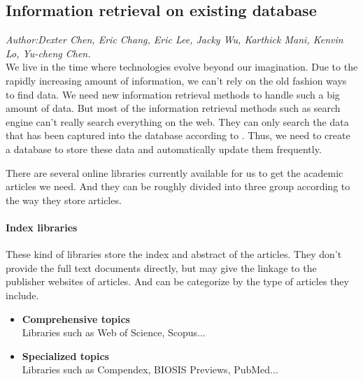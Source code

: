 	
\subsection{Information retrieval on existing database}
\textit{\footnotesize Author:Dexter Chen, Eric Chang, Eric Lee, Jacky Wu, Karthick Mani, Kenvin Lo, Yu-cheng Chen.}\\

We live in the time where technologies evolve beyond our imagination. Due to the rapidly increasing amount of information, we can't rely on the old fashion ways to find data. We need new information retrieval methods to handle such a big amount of data. But most of the information retrieval methods such as search engine can't really search everything on the web. They can only search the data that has been captured into the database according to \cite{Grehan2002}. Thus, we need to create a database to store these data and automatically update them frequently.

There are several online libraries currently available for us to get the academic articles we need. And they can be roughly divided into three group according to the way they store articles.
\paragraph{Index libraries}
	These kind of libraries store the index and abstract of the articles. They don't provide the full text documents directly, but may give the linkage to the publisher websites of articles. And can be categorize by the type of articles they include.
	\begin{itemize}
		\item\textbf{Comprehensive topics}\\Libraries such as Web of Science, Scopus...
		\item\textbf{Specialized topics}\\Libraries such as Compendex, BIOSIS Previews, PubMed...
	\end{itemize}
